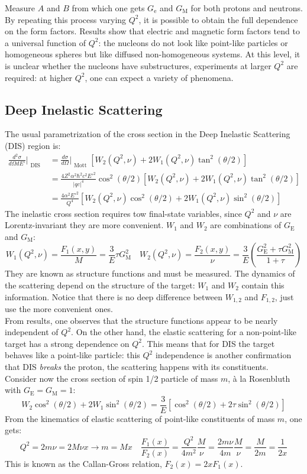 \documentclass[10.75pt,a4paper,openright,bottom=2cm]{article}
\begin{document}
Measure $A$ and $B$ from which one gets $G_{\text{e}}$ and $G_{\text{M}}$ for both protons and neutrons. By repeating this process varying $Q^2$, it is possible to obtain the full dependence on the form factors. Results show that electric and magnetic form factors tend to a universal function of $Q^2$: the nucleons do not look like point-like particles or homogeneous spheres but like diffused non-homogeneous systems. At this level, it is unclear whether the nucleons have substructures, experiments at larger $Q^2$ are required: at higher $Q^2$, one can expect a variety of phenomena. 
\subsection{Deep Inelastic Scattering}
The usual parametrization of the cross section in the Deep Inelastic Scattering (DIS) region is:
\begin{align*}
\frac{d^2\sigma}{d\Omega dE'}\Bigr|_{\substack{\text{DIS}}}&=\frac{d\sigma}{d\Omega}\Bigr|_{\substack{\text{Mott}}}[W_2(Q^2,\nu)+2W_1(Q^2,\nu)\tan^2(\theta/2)]\\
&=\frac{4Z^2\alpha^2\hbar^2c^2E'^2}{|qc|^4}\cos^2(\theta/2)[W_2(Q^2,\nu)+2W_1(Q^2,\nu)\tan^2(\theta/2)]\\
&=\frac{4\alpha^2E'^2}{Q^4}[W_2(Q^2,\nu)\cos^2(\theta/2)+2W_1(Q^2,\nu)\sin^2(\theta/2)]
\end{align*}
The inelastic cross section requires tow final-state variables, since $Q^2$ and $\nu$ are Lorentz-invariant they are more convenient. $W_1$ and $W_2$ are combinations of $G_{\text{E}}$ and $G_{\text{M}}$:
\[
W_1(Q^2,\nu)=\frac{F_1(x,y)}{M}=\frac{3}{E}\tau G^2_{\text{M}} \quad W_2(Q^2,\nu)=\frac{F_2(x,y)}{\nu}=\frac{3}{E}\left(\frac{G^2_{\text{E}}+\tau G_{\text{M}}^2}{1+\tau}\right)
\]
They are known as structure functions and must be measured. The dynamics of the scattering depend on the structure of the target: $W_1$ and $W_2$ contain this information. Notice that there is no deep difference between $W_{1,2}$ and $F_{1,2}$, just use the more convenient ones.\\
From results, one observes that the structure functions appear to be nearly independent of $Q^2$. On the other hand, the elastic scattering for a non-point-like target has a strong dependence on $Q^2$. This means that for DIS the target behaves like a point-like particle: this $Q^2$ independence is another confirmation that DIS \textit{breaks} the proton, the scattering happens with its constituents.\\
Consider now the cross section of spin 1/2 particle of mass $m$, à la Rosenbluth with $G_{\text{E}}=G_{\text{M}}=1$:
\[
W_2\cos^2(\theta/2)+2W_1\sin^2(\theta/2)=\frac{3}{E}[\cos^2(\theta/2)+2\tau\sin^2(\theta/2)]
\]
From the kinematics of elastic scattering of point-like constituents of mass $m$, one gets:
\[
Q^2=2m\nu=2M\nu x\to m=Mx \quad \frac{F_1(x)}{F_2(x)}=\frac{Q^2}{4m^2}\frac{M}{\nu}=\frac{2m\nu}{4m}\frac{M}{\nu}=\frac{M}{2m}=\frac{1}{2x}
\]
This is known as the Callan-Gross relation, $F_2(x)=2xF_1(x)$.
\end{document}
